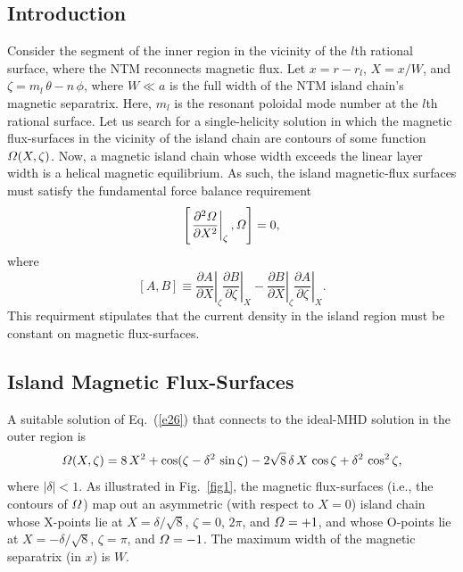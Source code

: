 \documentclass[12pt,prb,aps]{revtex4-1}
\begin{document}
\subsection{Introduction}
Consider the segment of the inner region in the vicinity of the $l$th rational surface, where the NTM reconnects magnetic flux. 
Let $x=r-r_{l}$, $X=x/W$, and $\zeta=m_{l}\,\theta-n\,\phi$, where $W\ll a$ is the full width  of the NTM island chain's magnetic separatrix. 
Here, $m_l$ is the resonant poloidal mode number at the $l$th rational surface. 
Let us search for a single-helicity solution in which the magnetic flux-surfaces in the vicinity of the island chain are contours of some function ${\mit\Omega}(X,\zeta)$.
Now, a magnetic island chain whose width exceeds the linear layer width is a helical magnetic equilibrium.\cite{ntm1} As such, the island magnetic-flux surfaces must satisfy the fundamental
force balance requirement\,\cite{island}
\begin{equation}\label{e26}
\left[\left.\frac{\partial^2{\mit\Omega}}{\partial X^2}\right|_\zeta,{\mit\Omega}\right]=0,
\end{equation}
where
\begin{equation}\label{poisson}
[A,B] \equiv \left.\frac{\partial A}{\partial X}\right|_\zeta \left.\frac{\partial B}{\partial\zeta}\right|_X- \left.\frac{\partial B}{\partial X}\right|_\zeta \left.\frac{\partial A}{\partial\zeta}\right|_X.
\end{equation}
This requirment stipulates that the current density in the island region must be constant on magnetic flux-surfaces. 

\subsection{Island Magnetic Flux-Surfaces}
A suitable solution of Eq.~(\ref{e26}) that connects to the ideal-MHD solution in the outer region is\,\cite{island}
\begin{equation}\label{e45}
{\mit\Omega}(X,\zeta) = 8\,X^2 + \cos(\zeta-\delta^2\,\sin\zeta) - 2\sqrt{8}\,\delta\,X\,\cos\zeta+\delta^2\,\cos^2\zeta,
\end{equation}
where $|\delta|<1$.  As illustrated in Fig.~\ref{fig1}, the magnetic flux-surfaces  (i.e., the contours of ${\mit\Omega}$) map out an
asymmetric (with respect to $X=0$) island chain whose 
X-points lie at $X=\delta/\sqrt{8}$, $\zeta = 0$, $2\pi$, and ${\mit\Omega}=+1$,  and whose  O-points lie at
$X=-\delta/\sqrt{8}$,  $\zeta=\pi$, and ${\mit\Omega}=-1$. The maximum width of the magnetic separatrix (in $x$) is $W$. 
\end{document}
